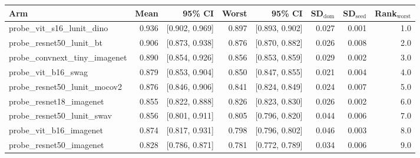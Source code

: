 \begin{tabular}{lrrrrrrr}
\toprule
Arm & Mean & 95\% CI & Worst & 95\% CI & SD$_\text{dom}$ & SD$_\text{seed}$ & Rank$_\text{worst}$ \\
\midrule
probe\_vit\_s16\_lunit\_dino & 0.936 & [0.902, 0.969] & 0.897 & [0.893, 0.902] & 0.027 & 0.001 & 1.0 \\
probe\_resnet50\_lunit\_bt & 0.906 & [0.873, 0.938] & 0.876 & [0.870, 0.882] & 0.026 & 0.008 & 2.0 \\
probe\_convnext\_tiny\_imagenet & 0.890 & [0.854, 0.926] & 0.856 & [0.853, 0.859] & 0.029 & 0.002 & 3.0 \\
probe\_vit\_b16\_swag & 0.879 & [0.853, 0.904] & 0.850 & [0.847, 0.855] & 0.021 & 0.004 & 4.0 \\
probe\_resnet50\_lunit\_mocov2 & 0.876 & [0.846, 0.906] & 0.841 & [0.824, 0.849] & 0.024 & 0.007 & 5.0 \\
probe\_resnet18\_imagenet & 0.855 & [0.822, 0.888] & 0.826 & [0.823, 0.830] & 0.026 & 0.002 & 6.0 \\
probe\_resnet50\_lunit\_swav & 0.856 & [0.801, 0.911] & 0.805 & [0.796, 0.820] & 0.044 & 0.006 & 7.0 \\
probe\_vit\_b16\_imagenet & 0.874 & [0.817, 0.931] & 0.798 & [0.796, 0.802] & 0.046 & 0.003 & 8.0 \\
probe\_resnet50\_imagenet & 0.828 & [0.786, 0.871] & 0.781 & [0.772, 0.789] & 0.034 & 0.006 & 9.0 \\
\bottomrule
\end{tabular}
